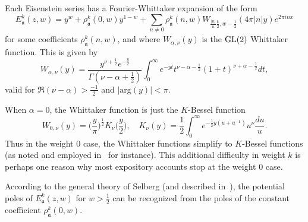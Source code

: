 Each Eisenstein series has a Fourier-Whittaker expansion of the form
\begin{equation}
  E_\mathfrak{a}^k(z,w) = y^w + \rho_\mathfrak{a}^k(0, w) y^{1-w} + \sum_{n \neq 0}
  \rho_\mathfrak{a}^k(n, w) W_{\frac{|n|}{n}\frac{k}{2}, w - \frac{1}{2}}(4\pi \lvert n
  \rvert y) e^{2\pi i n x}
\end{equation}
for some coefficients $\rho_\mathfrak{a}^k(n,w)$, and where $W_{\alpha, \nu}(y)$ is the
$\operatorname{GL}(2)$ Whittaker function.
This is given by~\cite[3.6.3]{GoldfeldHundleyI}
\begin{equation}
  W_{\alpha, \nu}(y) = \frac{y^{\nu + \frac{1}{2}}
  e^{-\frac{y}{2}}}{\Gamma(\nu - \alpha + \frac{1}{2})}
  \int_0^\infty e^{-yt} t^{\nu - \alpha - \frac{1}{2}}
  (1+t)^{\nu + \alpha - \frac{1}{2}} dt,
\end{equation}
valid for $\Re(\nu - \alpha) > \frac{-1}{2}$
and $\lvert \text{arg}(y) \rvert < \pi$.


When $\alpha = 0$, the Whittaker function is just the $K$-Bessel function
\begin{equation}
  W_{0, \nu}(y) = \big( \frac{y}{\pi}\big)^{\frac{1}{2}} K_\nu\big( \frac{y}{2} \big),
  \quad
  K_\nu(y) = \frac{1}{2} \int_0^\infty e^{-\frac{1}{2} y(u + u^{-1})}
  u^\nu \frac{du}{u}.
\end{equation}
Thus in the weight $0$ case, the Whittaker functions simplify to $K$-Bessel functions (as
noted and employed in~\cite{Goldfeld2006automorphic} for instance).
This additional difficulty in weight $k$ is perhaps one reason why most expository
accounts stop at the weight $0$ case.


According to the general theory of Selberg (and described in~\cite[Theorem
13.2]{Iwaniec97}), the potential poles of $E_\mathfrak{a}^k(z,w)$ for $w > \frac{1}{2}$
can be recognized from the poles of the constant coefficient $\rho_{\mathfrak{a}}^k(0,w)$.





